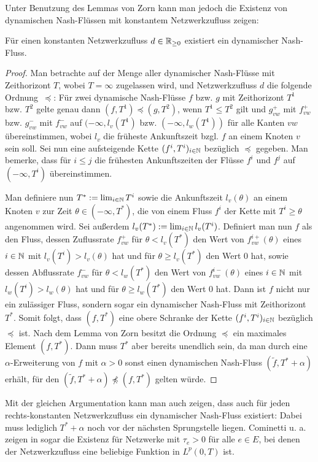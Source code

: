 Unter Benutzung des Lemmas von Zorn kann man jedoch die Existenz von dynamischen Nash-Flüssen mit konstantem Netzwerkzufluss zeigen:

\begin{theorem}
	Für einen konstanten Netzwerkzufluss $d\in\mathbb{R}_{\geq 0}$ existiert ein dynamischer Nash-Fluss.
\end{theorem}
\begin{proof}
	Man betrachte auf der Menge aller dynamischer Nash-Flüsse mit Zeithorizont $T$, wobei $T=\infty$ zugelassen wird, und Netzwerkzufluss $d$ die folgende Ordnung~$\preceq$:
	Für zwei dynamische Nash-Flüsse $f$ bzw. $g$ mit Zeithorizont $T^1$ bzw. $T^2$ gelte genau dann $(f, T^1)\preceq (g, T^2)$, wenn $T^1 \leq T^2$ gilt und $g^+_{vw}$ mit $f^+_{vw}$ bzw. $g^-_{vw}$ mit $f^-_{vw}$ auf $(-\infty, l_v(T^1)$ bzw. $(-\infty, l_w(T^1))$ für alle Kanten $vw$ übereinstimmen, wobei $l_v$ die früheste Ankunftszeit bzgl. $f$ an einem Knoten $v$ sein soll.
	Sei nun eine aufsteigende Kette $(f^i, T^i)_{i\in\mathbb{N}}$ bezüglich $\preceq$ gegeben.
	Man bemerke, dass für $i\leq j$ die frühesten Ankunftszeiten der Flüsse $f^i$ und $f^j$ auf $(-\infty, T^i)$ übereinstimmen.
	
	Man definiere nun $T^* := \lim_{i\in\mathbb{N}} T^i$ sowie die Ankunftszeit $l_v(\theta)$ an einem Knoten $v$ zur Zeit $\theta\in(-\infty, T^*)$, die von einem Fluss $f^i$ der Kette mit $T^i \geq \theta$ angenommen wird.
	Sei außerdem $l_v(T^*) := \lim_{i\in\mathbb{N}} l_v(T^i)$.
	Definiert man nun $f$ als den Fluss, dessen Zuflussrate $f_{vw}^+$ für $\theta<l_v(T^*)$ den Wert von $f^{i+}_{vw}(\theta)$ eines $i\in\mathbb{N}$ mit $l_v(T^i) > l_v(\theta)$ hat und für $\theta \geq l_v(T^*)$ den Wert $0$ hat, sowie dessen Abflussrate $f_{vw}^-$ für $\theta<l_w(T^*)$ den Wert von $f^{i-}_{vw}(\theta)$ eines $i\in\mathbb{N}$ mit $l_w(T^i) > l_w(\theta)$ hat und für $\theta \geq l_w(T^*)$ den Wert $0$ hat.
	Dann ist $f$ nicht nur ein zulässiger Fluss, sondern sogar ein dynamischer Nash-Fluss mit Zeithorizont $T^*$.
	Somit folgt, dass $(f, T^*)$ eine obere Schranke der Kette $(f^i, T^i)_{i\in\mathbb{N}}$ bezüglich $\preceq$ ist.
	Nach dem Lemma von Zorn besitzt die Ordnung $\preceq$ ein maximales Element $(f, T^*)$.
	Dann muss $T^*$ aber bereits unendlich sein, da man durch eine $\alpha$-Erweiterung von $f$ mit $\alpha > 0$ sonst einen dynamischen Nash-Fluss $(\tilde{f}, T^* + \alpha)$ erhält, für den $(\tilde{f}, T^* + \alpha) \npreceq (f, T^*)$ gelten würde.
\end{proof}

Mit der gleichen Argumentation kann man auch zeigen, dass auch für jeden rechts-konstanten Netzwerkzufluss ein dynamischer Nash-Fluss existiert:
Dabei muss lediglich $T^* + \alpha$ noch vor der nächsten Sprungstelle liegen.
Cominetti u. a. zeigen in \cite{Cominetti2015} sogar die Existenz für Netzwerke mit $\tau_e > 0$ für alle $e\in E$, bei denen der Netzwerkzufluss eine beliebige Funktion in $L^p(0,T)$ ist.